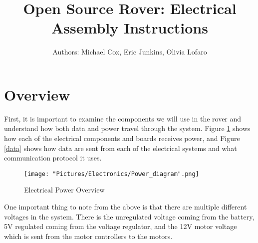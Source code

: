 \documentclass{article}
\begin{document}
\title{Open Source Rover: Electrical Assembly Instructions}
\author{Authors: Michael Cox, Eric Junkins, Olivia Lofaro}

\makeatletter         
\def\@maketitle{
\begin{center}	
	\makebox[\textwidth][c]{ \texttt{[image: "Pictures/Electronics/electronics title".png]}}
	{\Huge \bfseries \sffamily \@title }\\[3ex] 
	{\Large \sffamily \@author}\\[3ex] 
	\texttt{[image: "Pictures/Electronics/JPL logo".png]}
\end{center}}
\makeatother

\maketitle



\newpage

\tableofcontents

\newpage

\section{Overview}

First, it is important to examine the components we will use in the rover and understand how both data and power travel through the system. Figure \ref{power} shows how each of the electrical components and boards receives power, and Figure \ref{data} shows how data are sent from each of the electrical systems and what communication protocol it uses. 
\begin{figure}[H]
  	\centering
    	\texttt{[image: "Pictures/Electronics/Power\_diagram".png]}
  	\caption{Electrical Power Overview}
	\label{power}
\end{figure}

\noindent One important thing to note from the above is that there are multiple different voltages in the system. There is the unregulated voltage coming from the battery, 5V regulated coming from the voltage regulator, and the 12V motor voltage which is sent from the motor controllers to the motors. 
\end{document}
